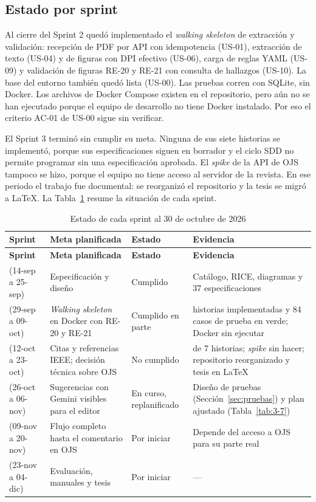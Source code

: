 \subsection{Estado por sprint}

Al cierre del Sprint 2 quedó implementado el \emph{walking skeleton} de extracción y validación: recepción de PDF por API con idempotencia (US-01), extracción de texto (US-04) y de figuras con DPI efectivo (US-06), carga de reglas YAML (US-09) y validación de figuras RE-20 y RE-21 con consulta de hallazgos (US-10). La base del entorno también quedó lista (US-00). Las pruebas corren con SQLite, sin Docker. Los archivos de Docker Compose existen en el repositorio, pero aún no se han ejecutado porque el equipo de desarrollo no tiene Docker instalado. Por eso el criterio AC-01 de US-00 sigue sin verificar.

El Sprint 3 terminó sin cumplir su meta. Ninguna de sus siete historias se implementó, porque sus especificaciones siguen en borrador y el ciclo SDD no permite programar sin una especificación aprobada. El \emph{spike} de la API de OJS tampoco se hizo, porque el equipo no tiene acceso al servidor de la revista. En ese periodo el trabajo fue documental: se reorganizó el repositorio y la tesis se migró a LaTeX. La Tabla~\ref{tab:3-4} resume la situación de cada sprint.

{\small
\begin{longtable}{@{}>{\raggedright\arraybackslash}p{}>{\raggedright\arraybackslash}p{}>{\raggedright\arraybackslash}p{}>{\raggedright\arraybackslash}p{}@{}}
\caption{Estado de cada sprint al 30 de octubre de 2026}\label{tab:3-4}\\
\toprule
\textbf{Sprint} & \textbf{Meta planificada} & \textbf{Estado} & \textbf{Evidencia} \\
\midrule
\endfirsthead
\toprule
\textbf{Sprint} & \textbf{Meta planificada} & \textbf{Estado} & \textbf{Evidencia} \\
\midrule
\endhead
\bottomrule
\endfoot
\endlastfoot
1 (14-sep a 25-sep) & Especificación y diseño & Cumplido & Catálogo, RICE, diagramas y 37 especificaciones \\
2 (29-sep a 09-oct) & \emph{Walking skeleton} en Docker con RE-20 y RE-21 & Cumplido en parte & 6 historias implementadas y 84 casos de prueba en verde; Docker sin ejecutar \\
3 (12-oct a 23-oct) & Citas y referencias IEEE; decisión técnica sobre OJS & No cumplido & 0 de 7 historias; \emph{spike} sin hacer; repositorio reorganizado y tesis en LaTeX \\
4 (26-oct a 06-nov) & Sugerencias con Gemini visibles para el editor & En curso, replanificado & Diseño de pruebas (Sección~\ref{sec:pruebas}) y plan ajustado (Tabla~\ref{tab:3-7}) \\
5 (09-nov a 20-nov) & Flujo completo hasta el comentario en OJS & Por iniciar & Depende del acceso a OJS para su parte real \\
6 (23-nov a 04-dic) & Evaluación, manuales y tesis & Por iniciar & --- \\
\end{longtable}
}

